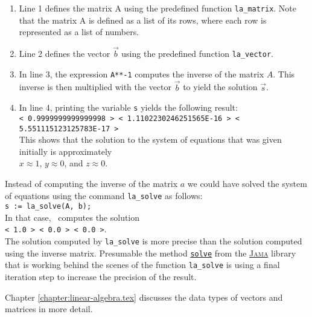 \begin{enumerate}
\item Line 1 defines the matrix $\mathrm{A}$ using the predefined function \texttt{la\_matrix}.
      Note that the matrix $\mathrm{A}$ is defined as a list of its rows, where each row is
      represented as a list of numbers.
\item Line 2 defines the vector $\vec{b}$ using the predefined function \texttt{la\_vector}.
\item In line 3, the expression \texttt{A**-1} computes the inverse of the matrix $A$.
      This inverse is then multiplied with the vector $\vec{b}$ to yield the solution $\vec{s}$.
\item In line 4, printing the variable \texttt{s} yields the following result:
      \\[0.2cm]
      \hspace*{-0.8cm}
      \texttt{< 0.9999999999999998 >  < 1.1102230246251565E-16 >  < 5.551115123125783E-17 >}
      \\[0.2cm]
      This shows that the solution to the system of equations that was given initially is approximately
      \\[0.2cm]
      \hspace*{1.3cm}
      $x \approx 1$, \quad $y \approx 0$, \quad and \quad $z \approx 0$.  
\end{enumerate}
Instead of computing the inverse of the matrix $a$ we could have solved the system of equations
using the command \texttt{la\_solve} as follows:
\\[0.2cm]
\hspace*{1.3cm}
\texttt{s := la\_solve(A, b);}
\\[0.2cm]
In that case, \setlx\ computes the solution
\\[0.2cm]
\hspace*{1.3cm}
\texttt{< 1.0 >  < 0.0 >  < 0.0 >}.
\\[0.2cm]
The solution computed by \texttt{la\_solve} is more precise than the solution computed using the
inverse matrix.  Presumable the method
\href{http://math.nist.gov/javanumerics/jama/doc/Jama/Matrix.html#solve(Jama.Matrix)}{\texttt{solve}}
from the \href{http://math.nist.gov/javanumerics/jama}{\textsc{Jama}} library that is working behind the
scenes of the function \texttt{la\_solve} is using a final iteration step to increase the precision
of the result.
\vspace*{0.2cm}

\noindent
Chapter \ref{chapter:linear-algebra.tex} discusses the data types of vectors and matrices in more
detail. 




